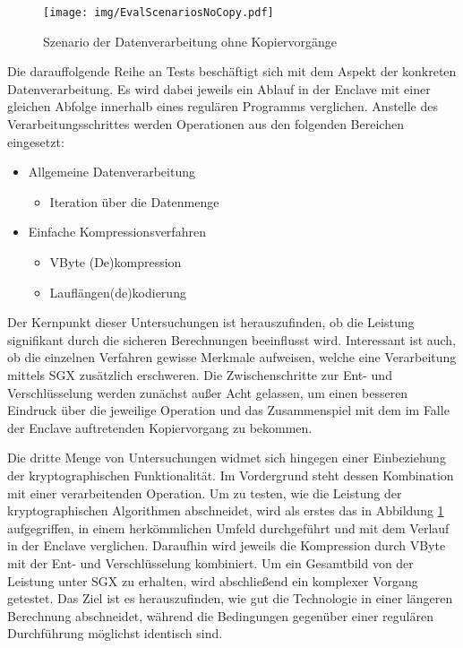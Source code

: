 \begin{figure}[h]
	\texttt{[image: img/EvalScenariosNoCopy.pdf]}
	\centering
	\caption{Szenario der Datenverarbeitung ohne Kopiervorgänge}
	\label{fig:scenarionocopy}
\end{figure}
Die darauffolgende Reihe an Tests beschäftigt sich mit dem Aspekt der konkreten Datenverarbeitung. Es wird dabei jeweils ein Ablauf in der Enclave mit einer gleichen Abfolge innerhalb eines regulären Programms verglichen. Anstelle des Verarbeitungsschrittes werden Operationen aus den folgenden Bereichen eingesetzt:

\begin{itemize}
	\item Allgemeine Datenverarbeitung
	\begin{itemize}
		\item Iteration über die Datenmenge
	\end{itemize}
	\item Einfache Kompressionsverfahren
	\begin{itemize}
		\item VByte (De)kompression
		\item Lauflängen(de)kodierung
	\end{itemize}
\end{itemize}

Der Kernpunkt dieser Untersuchungen ist herauszufinden, ob die Leistung signifikant durch die sicheren Berechnungen beeinflusst wird. Interessant ist auch, ob die einzelnen Verfahren gewisse Merkmale aufweisen, welche eine Verarbeitung mittels SGX zusätzlich erschweren. Die Zwischenschritte zur Ent- und Verschlüsselung werden zunächst außer Acht gelassen, um einen besseren Eindruck über die jeweilige Operation und das Zusammenspiel mit dem im Falle der Enclave auftretenden Kopiervorgang zu bekommen.

Die dritte Menge von Untersuchungen widmet sich hingegen einer Einbeziehung der kryptographischen Funktionalität. Im Vordergrund steht dessen Kombination mit einer verarbeitenden Operation. Um zu testen, wie die Leistung der kryptographischen Algorithmen abschneidet, wird als erstes das in Abbildung \ref{fig:scenarionocopy} aufgegriffen, in einem herkömmlichen Umfeld durchgeführt und mit dem Verlauf in der Enclave verglichen. Daraufhin wird jeweils die Kompression durch VByte mit der Ent- und Verschlüsselung kombiniert. Um ein Gesamtbild von der Leistung unter SGX zu erhalten, wird abschließend ein komplexer Vorgang getestet. Das Ziel ist es herauszufinden, wie gut die Technologie in einer längeren Berechnung abschneidet, während die Bedingungen gegenüber einer regulären Durchführung möglichst identisch sind. %
